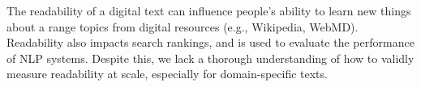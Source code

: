 The readability of a digital text can influence people's ability to learn new things about a range topics from digital resources (e.g., Wikipedia, WebMD). Readability also impacts search rankings, and is used to evaluate the performance of NLP systems. Despite this, we lack a thorough understanding of how to validly measure readability at scale, especially for domain-specific texts.